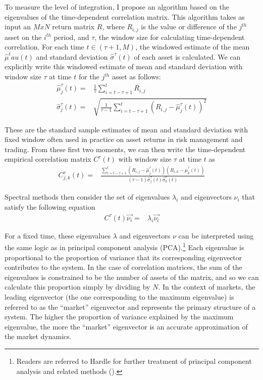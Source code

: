\documentclass[3p]{elsarticle}
\begin{document}
To measure the level of integration, I propose an algorithm based on the eigenvalues of the time-dependent correlation matrix.  This algorithm takes as input an $M x N$ return matrix $R$, where $R_{i,j}$ is the value or difference of the $j^{th}$ asset on the $i^{th}$ period, and $\tau$, the window size for calculating time-dependent correlation.  For each time $t \in (\tau+1, M)$, the windowed estimate of the mean $\hat{\mu}^tau(t)$ and standard deviation $\hat{\sigma}^\tau(t)$ of each asset is calculated.  We can explicitly write this windowed estimate of mean and standard deviation with window size $\tau$ at time $t$ for the $j^{th}$ asset as follows:
\begin{align*}
	\hat{\mu}^\tau_j(t) =& \frac{1}{\tau} \sum_{i = t - \tau + 1}^{t} R_{i,j}\\
	\hat{\sigma}^\tau_j(t) =& \sqrt{\frac{1}{\tau - 1} \sum_{i = t - \tau + 1}^t (R_{i,j} - \hat{\mu}^\tau_j(t))^2}
\end{align*}

These are the standard sample estimates of mean and standard deviation with fixed window often used in practice on asset returns in risk management and trading.  From these first two moments, we can then write the time-dependent empirical correlation matrix $C^\tau(t)$ with window size $\tau$ at time $t$ as
\begin{align*}
	C_{j,k}^\tau(t) =& \frac{\sum_{i = t - \tau + 1}^t (R_{i,j} - \hat{\mu}^\tau_j(t)) (R_{i,k} - \hat{\mu}^\tau_k(t))}{(\tau - 1) \hat{\sigma}^\tau_j(t) \hat{\sigma}^\tau_k(t)}
\end{align*}

Spectral methods then consider the set of eigenvalues $\lambda_i$ and eigenvectors $\nu_i$ that satisfy the following equation
\begin{align*}
	C^\tau(t) \vec{\nu_i} =& \lambda_i \vec{\nu_i}
\end{align*}

For a fixed time, these eigenvalues $\lambda$ and eigenvectors $\nu$ can be interpreted using the same logic as in principal component analysis (PCA).\footnote{Readers are referred to Hardle for further treatment of principal component analysis and related methods (\cite{Hardle2007}).}   Each eigenvalue is proportional to the proportion of variance that its corresponding eigenvector contributes to the system.  In the case of correlation matrices, the sum of the eigenvalues is constrained to be the number of assets of the matrix, and so we can calculate this proportion simply by dividing by $N$.  In the context of markets, the leading eigenvector (the one corresponding to the maximum eigenvalue) is referred to as the ``market'' eigenvector and represents the primary structure of a system.  The higher the proportion of variance explained by the maximum eigenvalue, the more the ``market'' eigenvector is an accurate approximation of the market dynamics.  
\end{document}
